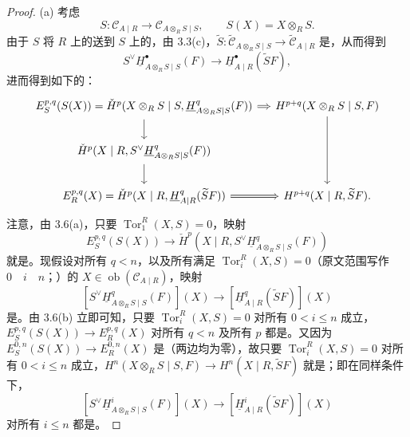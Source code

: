 \begin{proof}
(a) 考虑
\[S:\mathcal C_{A\mid R}\longrightarrow\mathcal C_{A\otimes_R S\mid S},\qquad S(X)=X\otimes_R S.\]
由于 $S$ 将 $R$ 上的送到 $S$ 上的，由 3.3(c)，$\widetilde S:\widetilde{\mathcal C}_{A\otimes_R S\mid S}\to\widetilde{\mathcal C}_{A\mid R}$ 是，从而得到
\[S^{\vee}\underline H^{\bullet}_{A\otimes_R S\mid S}(F)\longrightarrow\underline H^{\bullet}_{A\mid R}(\widetilde SF),\]
进而得到如下的：
\[
\begin{tikzcd}[column sep=small]
E_S^{p,q}(S(X))=\check H^p(X\otimes_R S\mid S,\underline H^q_{A\otimes_R S\mid S}(F))\arrow[d]\arrow[r,Rightarrow]&H^{p+q}(X\otimes_R S\mid S,F)\arrow[dd]\\
\check H^p(X\mid R,S^{\vee}\underline H^q_{A\otimes_R S\mid S}(F))\arrow[d]&\\
E_R^{p,q}(X)=\check H^p(X\mid R,\underline H^q_{A\mid R}(\widetilde SF))\arrow[r,Rightarrow]&H^{p+q}(X\mid R,\widetilde SF).
\end{tikzcd}
\]
注意，由 3.6(a)，只要 $\operatorname{Tor}_1^R(X,S)=0$，映射
\[E_S^{p,q}(S(X))\longrightarrow\check H^p(X\mid R,S^{\vee}\underline H^q_{A\otimes_R S\mid S}(F))\]
就是。现假设对所有 $q<n$，以及所有满足 $\operatorname{Tor}_i^R(X,S)=0$（原文范围写作 $0\quad i\quad n$；）的 $X\in\operatorname{ob}(\mathcal C_{A\mid R})$，映射
\[[S^{\vee}\underline H^q_{A\otimes_R S\mid S}(F)](X)\longrightarrow[\underline H^q_{A\mid R}(\widetilde SF)](X)\]
是。由 3.6(b) 立即可知，只要 $\operatorname{Tor}_i^R(X,S)=0$ 对所有 $0<i\leq n$ 成立，$E_S^{p,q}(S(X))\to E_R^{p,q}(X)$ 对所有 $q<n$ 及所有 $p$ 都是。又因为 $E_S^{0,n}(S(X))\to E_R^{0,n}(X)$ 是（两边均为零），故只要 $\operatorname{Tor}_i^R(X,S)=0$ 对所有 $0<i\leq n$ 成立，$H^n(X\otimes_R S\mid S,F)\to H^n(X\mid R,\widetilde SF)$ 就是；即在同样条件下，
\[[S^{\vee}\underline H^i_{A\otimes_R S\mid S}(F)](X)\longrightarrow[\underline H^i_{A\mid R}(\widetilde SF)](X)\]
对所有 $i\leq n$ 都是。


\end{proof}
